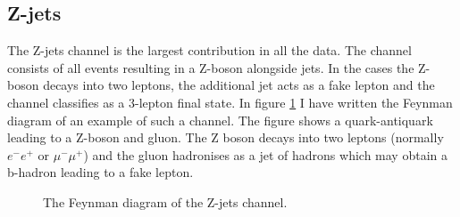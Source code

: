 \subsection{Z-jets}
The Z-jets channel is the largest contribution in all the data. The channel consists of all events
resulting in a Z-boson alongside jets. In the cases the Z-boson decays into two leptons, the additional 
jet acts as a fake lepton and the channel classifies as a 3-lepton final state. In figure \ref{fig:z_pjets} 
I have written the Feynman diagram of an example of such a channel. The figure shows a quark-antiquark leading 
to a Z-boson and gluon. The Z boson decays into two leptons (normally 
$e^-e^+$ or $\mu^- \mu^+$) and the gluon hadronises as a jet of hadrons which may obtain a b-hadron leading to a 
fake lepton. 
\begin{figure}
    \centering
    \caption{The Feynman diagram of the  Z-jets channel.}
    \label{fig:z_pjets}
\end{figure}

